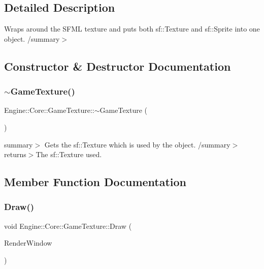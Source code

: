 \subsection{Detailed Description}
Wraps around the S\+F\+ML texture and puts both sf\+::\+Texture and sf\+::\+Sprite into one object. /summary$>$ 

\subsection{Constructor \& Destructor Documentation}
\mbox{\label{class_engine_1_1_core_1_1_game_texture_a37c2ee2ebfdfc3301b6070d2df10d59a}} 
\subsubsection{\texorpdfstring{$\sim$\+Game\+Texture()}{~GameTexture()}}
{\footnotesize\ttfamily Engine\+::\+Core\+::\+Game\+Texture\+::$\sim$\+Game\+Texture (\begin{DoxyParamCaption}{ }\end{DoxyParamCaption})}

summary$>$ Gets the sf\+::\+Texture which is used by the object. /summary$>$ returns$>$The sf\+::\+Texture used.

\subsection{Member Function Documentation}
\mbox{\label{class_engine_1_1_core_1_1_game_texture_a108f525f52213ec94dd9a63d1be9dd0f}} 
\subsubsection{\texorpdfstring{Draw()}{Draw()}}
{\footnotesize\ttfamily void Engine\+::\+Core\+::\+Game\+Texture\+::\+Draw (\begin{DoxyParamCaption}\item[{Render\+Window $\ast$}]{Render\+Window }\end{DoxyParamCaption})}

